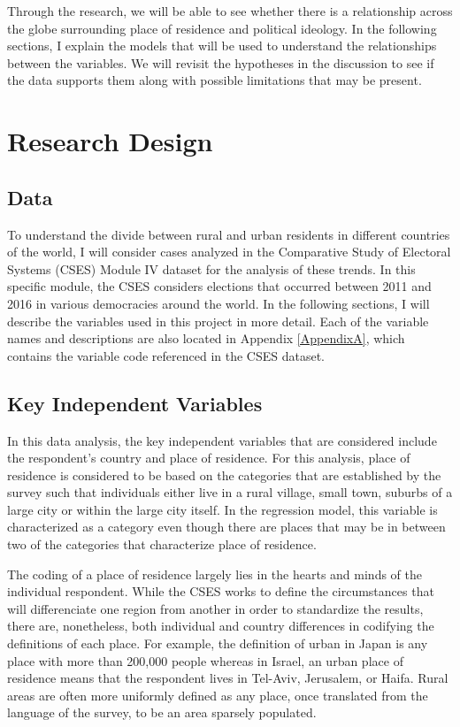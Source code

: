 \documentclass[12pt, titlepage]{article}
\begin{document}
Through the research, we will be able to see whether there is a relationship across the globe surrounding place of residence and political ideology. In the following sections, I explain the models that will be used to understand the relationships between the variables. We will revisit the hypotheses in the discussion to see if the data supports them along with possible limitations that may be present.

\section{Research Design}

\subsection{Data}

To understand the divide between rural and urban residents in different countries of the world, I will consider cases analyzed in the Comparative Study of Electoral Systems (CSES) Module IV dataset for the analysis of these trends. In this specific module, the CSES considers elections that occurred between 2011 and 2016 in various democracies around the world. In the following sections, I will describe the variables used in this project in more detail. Each of the variable names and descriptions are also located in Appendix \ref{AppendixA}, which contains the variable code referenced in the CSES dataset.

\subsection{Key Independent Variables}

In this data analysis, the key independent variables that are considered include the respondent's country and place of residence. For this analysis, place of residence is considered to be based on the categories that are established by the survey such that individuals either live in a rural village, small town, suburbs of a large city or within the large city itself. In the regression model, this variable is characterized as a category even though there are places that may be in between two of the categories that characterize place of residence. 

The coding of a place of residence largely lies in the hearts and minds of the individual respondent. While the CSES works to define the circumstances that will differenciate one region from another in order to standardize the results, there are, nonetheless, both individual and country differences in codifying the definitions of each place. For example, the definition of urban in Japan is any place with more than 200,000 people whereas in Israel, an urban place of residence means that the respondent lives in Tel-Aviv, Jerusalem, or Haifa. Rural areas are often more uniformly defined as any place, once translated from the language of the survey, to be an area sparsely populated. 
\end{document}
